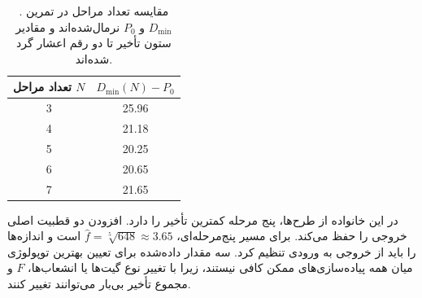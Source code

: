 \begin{table}[htbp]
  \centering
  \caption{مقایسه تعداد مراحل در تمرین .
  \(D_{\min}\) و \(P_0\) نرمال‌شده‌اند و مقادیر ستون تأخیر
  تا دو رقم اعشار گرد شده‌اند.}
  \label{tab:delay-exercise-stage-count}
  \begin{tabular}{cc}
    \toprule
    تعداد مراحل \(N\) & \(D_{\min}(N)-P_0\) \\
    \midrule
    \num{3} & \num{25.96} \\
    \num{4} & \num{21.18} \\
    \num{5} & \num{20.25} \\
    \num{6} & \num{20.65} \\
    \num{7} & \num{21.65} \\
    \bottomrule
  \end{tabular}
\end{table}

در این خانواده از طرح‌ها، پنج مرحله کمترین تأخیر را دارد.
افزودن دو  قطبیت اصلی خروجی را حفظ می‌کند.
برای مسیر پنج‌مرحله‌ای، \(\widehat f=\sqrt[5]{648}\approx3.65\)
است و اندازه‌ها را باید از خروجی به ورودی تنظیم کرد.
سه مقدار داده‌شده برای تعیین بهترین توپولوژی میان همه پیاده‌سازی‌های
ممکن کافی نیستند، زیرا با تغییر نوع گیت‌ها یا انشعاب‌ها،
\(F\) و مجموع تأخیر بی‌بار می‌توانند تغییر کنند.

